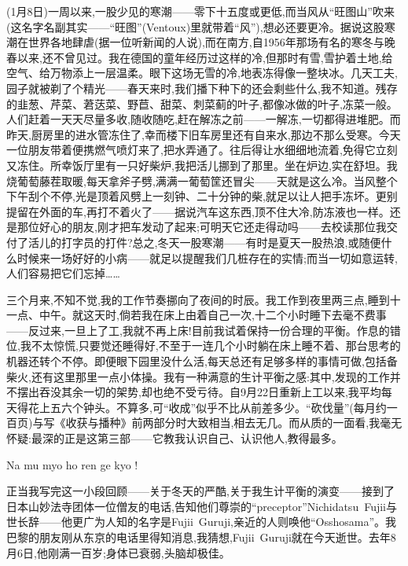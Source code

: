 (1月8日)一周以来,一股少见的寒潮——零下十五度或更低,而当风从“旺图山”吹来(这名字名副其实——“旺图”(Ventoux)里就带着“风”),想必还要更冷。据说这股寒潮在世界各地肆虐(据一位听新闻的人说),而在南方,自1956年那场有名的寒冬与晚春以来,还不曾见过。我在德国的童年经历过这样的冷,但那时有雪,雪护着土地,给空气、给万物添上一层温柔。眼下这场无雪的冷,地表冻得像一整块冰。几天工夫,园子就被剃了个精光——春天来时,我们播下种下的还会剩些什么,我不知道。残存的韭葱、芹菜、莙荙菜、野苣、甜菜、刺菜蓟的叶子,都像冰做的叶子,冻菜一般。人们赶着一天天尽量多收,随收随吃,赶在解冻之前——一解冻,一切都得进堆肥。而昨天\dmark{},厨房里的进水管冻住了,幸而楼下旧车房里还有自来水,那边不那么受寒。今天一位朋友带着便携燃气喷灯来了,把水弄通了。往后得让水细细地流着,免得它立刻又冻住。所幸饭厅里有一只好柴炉,我把活儿挪到了那里。坐在炉边,实在舒坦。我烧葡萄藤茬取暖,每天拿斧子劈,满满一葡萄筐还冒尖——天就是这么冷。当风整个下午刮个不停,光是顶着风劈上一刻钟、二十分钟的柴,就足以让人把手冻坏。更别提留在外面的车,再打不着火了——据说汽车这东西,顶不住大冷,防冻液也一样。还是那位好心的朋友,刚才把车发动了起来;可明天它还走得动吗——去校读那位我交付了活儿的打字员的打件?总之,冬天一股寒潮——有时是夏天一股热浪,或随便什么时候来一场好好的小病——就足以提醒我们几桩存在的实情;而当一切如意运转,人们容易把它们忘掉……

三个月来,不知不觉,我的工作节奏挪向了夜间的时辰。我工作到夜里两三点,睡到十一点、中午。就这天时,倘若我在床上由着自己一次,十二个小时睡下去毫不费事——反过来,一旦上了工,我就不再上床!目前我试着保持一份合理的平衡。作息的错位,我不太惊慌,只要觉还睡得好,不至于一连几个小时躺在床上睡不着、那台思考的机器还转个不停。即便眼下园里没什么活,每天总还有足够多样的事情可做,包括备柴火,还有这里那里一点小体操。我有一种满意的生计平衡之感:其中,发现的工作并不摆出吞没其余一切的架势,却也绝不受亏待。自9月22日重新上工以来,我平均每天得花上五六个钟头。不算多,可“收成”似乎不比从前差多少。“砍伐量”(每月约一百页)与写《收获与播种》前两部分时大致相当,相去无几。而从质的一面看,我毫无怀疑:最深的正是这第三部——它教我认识自己、认识他人,教得最多。

\asterisms

\dmark{}Na mu myo ho ren ge kyo !

正当我写完这一小段回顾——关于冬天的严酷,关于我生计平衡的演变——接到了日本山妙法寺团体一位僧友的电话,告知他们尊崇的“preceptor”Nichidatsu~Fujii与世长辞——他更广为人知的名字是Fujii~Guruji,亲近的人则唤他“Osshosama”。我巴黎的朋友刚从东京的电话里得知消息,我猜想,Fujii~Guruji就在今天逝世。去年8月6日,他刚满一百岁;身体已衰弱,头脑却极佳。

